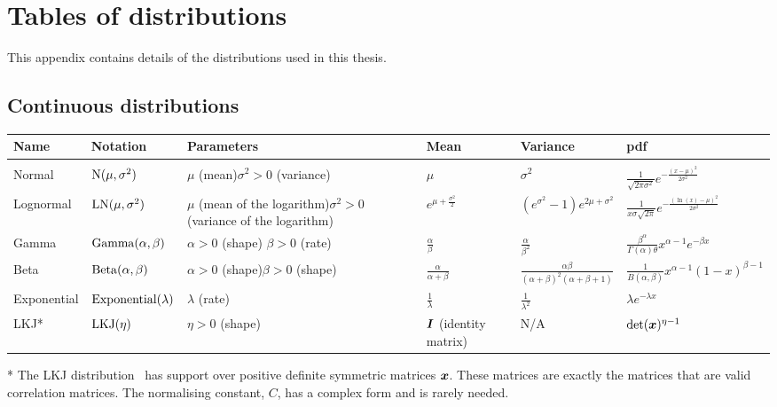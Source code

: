 \documentclass[thesis.tex]{subfiles}
\begin{document}
\chapter{Tables of distributions} \label{distributions}

This appendix contains details of the distributions used in this thesis.

\begin{landscape}
\section{Continuous distributions}
\begin{tabular}{llp{3.5cm}lll}
Name & Notation & Parameters & Mean & Variance & pdf\\
\hline \\
Normal & $\operatorname{N}(\mu, \sigma^2)$ & $\mu$ (mean)\newline $\sigma^2 > 0$ (variance) & $\mu$ & $\sigma^2$ & $\frac{1}{\sqrt{2\pi\sigma^2}}e^{-\frac{(x-\mu)^2}{2\sigma^2}}$ \\
Lognormal & $\operatorname{LN}(\mu, \sigma^2)$ & $\mu$ (mean of the logarithm)\newline $\sigma^2 > 0$ (variance of the logarithm) & $e^{\mu + \frac{\sigma^2}{2}}$ & $(e^{\sigma^2} - 1)e^{2\mu + \sigma^2}$ & $\frac{1}{x\sigma\sqrt{2\pi}}e^{-\frac{(\ln(x)-\mu)^2}{2\sigma^2}}$ \\
Gamma & $\operatorname{Gamma}(\alpha, \beta)$ & $\alpha > 0$ (shape) \newline $\beta > 0$ (rate) & $\frac{\alpha}{\beta}$ & $\frac{\alpha}{\beta^2}$ & $\frac{\beta^\alpha}{\Gamma(\alpha)\theta}x^{\alpha-1}e^{-\beta x}$ \\
Beta & $\operatorname{Beta}(\alpha, \beta)$ & $\alpha > 0$ (shape)\newline $\beta > 0$ (shape) & $\frac{\alpha}{\alpha+\beta}$ & $\frac{\alpha\beta}{(\alpha+\beta)^2(\alpha+\beta+1)}$ & $\frac{1}{B(\alpha,\beta)}x^{\alpha-1}(1-x)^{\beta-1}$ \\
Exponential & $\operatorname{Exponential}(\lambda)$ & $\lambda$ (rate) & $\frac{1}{\lambda}$ & $\frac{1}{\lambda^2}$ & $\lambda e^{-\lambda x}$ \\
LKJ* & $\operatorname{LKJ}(\eta)$ & $\eta > 0$ (shape) & $\bm{I}$ (identity matrix) & N/A & $\det(\bm{x})^{\eta-1}$ \\
\end{tabular}

* The LKJ distribution~\autocite{lewandowskiGenerating} has support over positive definite symmetric matrices $\bm{x}$.
These matrices are exactly the matrices that are valid correlation matrices.
The normalising constant, $C$, has a complex form and is rarely needed.


\end{landscape}
\end{document}
